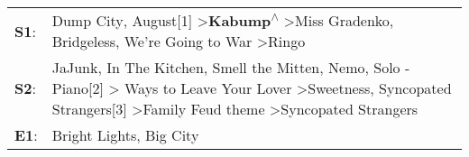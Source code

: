 \begin{supertabular}{p{0.03\textwidth}p{0.92\textwidth}}
 \textbf{S1}:  &                                                                                                                                                                     Dump City\textsuperscript{}, \enspace August[1]\textsuperscript{} \textgreater \enspace \textbf{Kabump\textsuperscript{$\wedge$}} \textgreater \enspace Miss Gradenko\textsuperscript{}, \enspace Bridgeless\textsuperscript{}, \enspace We're Going to War\textsuperscript{} \textgreater \enspace Ringo\textsuperscript{}  \enspace  \\
 \textbf{S2}:  &  JaJunk\textsuperscript{}, \enspace In The Kitchen\textsuperscript{}, \enspace Smell the Mitten\textsuperscript{}, \enspace Nemo\textsuperscript{}, \enspace Solo - Piano[2]\textsuperscript{} \textgreater {} Ways to Leave Your Lover\textsuperscript{} \textgreater \enspace Sweetness\textsuperscript{}, \enspace Syncopated Strangers[3]\textsuperscript{} \textgreater \enspace Family Feud theme\textsuperscript{} \textgreater \enspace Syncopated Strangers\textsuperscript{}  \enspace  \\
 \textbf{E1}:  &                                                                                                                                                                                                                                                                                                                                                                                                                                                       Bright Lights, Big City\textsuperscript{}  \enspace  \\
\end{supertabular}

